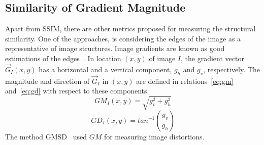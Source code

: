 \subsection{Similarity of Gradient Magnitude}
Apart from SSIM, there are other metrics proposed for measuring the structural similarity. One of the approaches, is considering the edges of the image as a representative of image structures. Image gradients are known as good estimations of the edges~\cite{Gonzalez2008}. In location $(x, y)$ of image $I$, the gradient vector $\Vec{G}_I(x, y)$ has a horizontal and a vertical component, $g_h$ and $g_v$, respectively. The magnitude and direction of $\Vec{G}_I$ in $(x, y)$ are defined in relations~\ref{eq:gm} and~\ref{eq:gd} with respect to these components.
\begin{equation}
    GM_I(x, y) = \sqrt{g_v^2+g_h^2}
    \label{eq:gm}
\end{equation}
\begin{equation}
    GD_I(x, y) = tan^{-1}(\frac{g_v}{g_h})
    \label{eq:gd}
\end{equation}
The method GMSD~\cite{Xue2014} used $GM$ for measuring image distortions.
